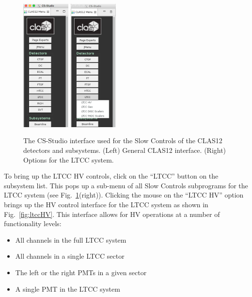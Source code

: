 \documentclass{article}
\begin{document}
\begin{figure}[ht]
  \centering
		\includegraphics[width=0.22\textwidth]{img/clascss1}
		\hspace{2cm}
		\includegraphics[width=0.22\textwidth]{img/clascss2}
	\caption{The CS-Studio interface used for the Slow Controls of the CLAS12 detectors and subsystems. 
	(Left) General CLAS12 interface. (Right) Options for the LTCC system.}
 		\label{fig:clascss}
\end{figure}

\clearpage
To bring up the LTCC HV controls, click on the ``LTCC'' button on the subsystem list. This pops up a 
sub-menu of all Slow Controls subprograms for the LTCC system 
(see Fig.~\ref{fig:clascss}(right)). Clicking the mouse on the ``LTCC HV'' option brings up the HV control 
interface for the LTCC system as shown in Fig.~\ref{fig:ltccHV}. This interface allows for HV 
operations at a number of functionality levels:

\begin{itemize}
\item All channels in the full LTCC system
\item All channels in a single LTCC sector
\item The left  or the right PMTs in a given sector
\item A single PMT in the LTCC system
\end{itemize}
\end{document}
